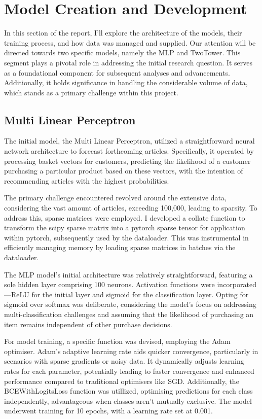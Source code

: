 \documentclass[conference,compsoc]{IEEEtran}
\begin{document}
\section{Model Creation and Development}
In this section of the report, I'll explore the architecture of the models, their training process, and how data was managed and supplied. Our attention will be directed towards two specific models, namely the MLP and TwoTower. This segment plays a pivotal role in addressing the initial research question. It serves as a foundational component for subsequent analyses and advancements. Additionally, it holds significance in handling the considerable volume of data, which stands as a primary challenge within this project.

\subsection{Multi Linear Perceptron}
The initial model, the Multi Linear Perceptron, utilized a straightforward neural network architecture to forecast forthcoming articles. Specifically, it operated by processing basket vectors for customers, predicting the likelihood of a customer purchasing a particular product based on these vectors, with the intention of recommending articles with the highest probabilities.

The primary challenge encountered revolved around the extensive data, considering the vast amount of articles, exceeding 100,000, leading to sparsity. To address this, sparse matrices were employed. I developed a collate function to transform the scipy sparse matrix into a pytorch sparse tensor for application within pytorch, subsequently used by the dataloader. This was instrumental in efficiently managing memory by loading sparse matrices in batches via the dataloader.

The MLP model's initial architecture was relatively straightforward, featuring a sole hidden layer comprising 100 neurons. Activation functions were incorporated—ReLU for the initial layer and sigmoid for the classification layer. 
Opting for sigmoid over softmax was deliberate, considering the model's focus on addressing multi-classification challenges and assuming that the likelihood of purchasing an item remains independent of other purchase decisions.

For model training, a specific function was devised, employing the Adam optimiser. Adam's adaptive learning rate aids quicker convergence, particularly in scenarios with sparse gradients or noisy data. It dynamically adjusts learning rates for each parameter, potentially leading to faster convergence and enhanced performance compared to traditional optimisers like SGD. Additionally, the BCEWithLogitsLoss function was utillized, optimising predictions for each class independently, advantageous when classes aren't mutually exclusive. The model underwent training for 10 epochs, with a learning rate set at 0.001.
\end{document}
